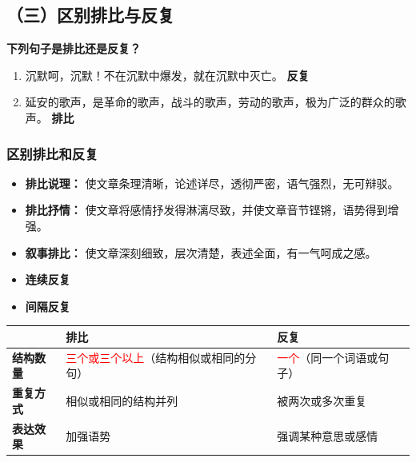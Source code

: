 \subsection*{（三）区别排比与反复}

\textbf{下列句子是排比还是反复？}


\begin{enumerate}
    \item 沉默呵，沉默！不在沉默中爆发，就在沉默中灭亡。 \hfill \textbf{反复}
    \item 延安的歌声，是革命的歌声，战斗的歌声，劳动的歌声，极为广泛的群众的歌声。 \hfill \textbf{排比}
\end{enumerate}

\subsubsection*{区别排比和反复}

\begin{definition}[排比] \label{def:int} 
\begin{itemize}
    \item \textbf{排比说理：} 使文章条理清晰，论述详尽，透彻严密，语气强烈，无可辩驳。
    \item \textbf{排比抒情：} 使文章将感情抒发得淋漓尽致，并使文章音节铿锵，语势得到增强。
    \item \textbf{叙事排比：} 使文章深刻细致，层次清楚，表述全面，有一气呵成之感。
\end{itemize}
\end{definition}


\begin{definition}[反复] \label{def:int} 
\begin{itemize}
    \item \textbf{连续反复} 
    \item \textbf{间隔反复} 
\end{itemize}
\end{definition}

\begin{center}
    \renewcommand{\arraystretch}{1.8}
    \begin{tabular}{|>{\centering\arraybackslash}p{3cm}|>{\centering\arraybackslash}p{5.5cm}|>{\centering\arraybackslash}p{5.5cm}|}
        \hline
        & \textbf{排比} & \textbf{反复} \\
        \hline
        \textbf{结构数量} & \textcolor{red}{三个或三个以上}（结构相似或相同的分句） & \textcolor{red}{一个}（同一个词语或句子） \\
        \hline
        \textbf{重复方式} & 相似或相同的结构并列 & 被两次或多次重复 \\
        \hline
        \textbf{表达效果} & 加强语势 & 强调某种意思或感情 \\
        \hline
    \end{tabular}
\end{center}

